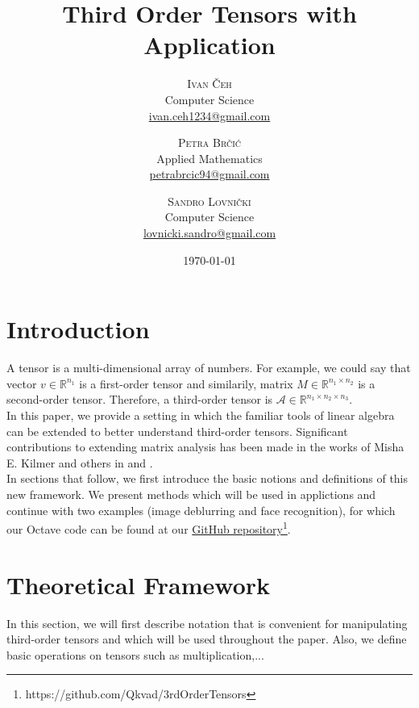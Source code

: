 \documentclass[twoside]{article}
\title{Third Order Tensors with Application} %
\author{%
\textsc{Ivan \v{C}eh}\\%
\normalsize Computer Science \\
\normalsize \href{mailto:ivan.ceh1234@gmail.com}{ivan.ceh1234@gmail.com} 
\and
\textsc{Petra Br\v{c}i\'c}\\%
\normalsize Applied Mathematics \\
\normalsize \href{mailto:petrabrcic94@gmail.com}{petrabrcic94@gmail.com} 
\and
\textsc{Sandro Lovni\v{c}ki}\\%
\normalsize Computer Science \\ 
\normalsize \href{mailto:lovnicki.sandro@gmail.com}{lovnicki.sandro@gmail.com}
}
\date{\today}
\begin{document}
\maketitle

\begin{multicols}{2}

\section{Introduction}
A tensor is a multi-dimensional array of numbers. For example, we could say that vector $v \in \mathbb{R}^{n_1}$ is a first-order tensor and similarily, matrix $M \in \mathbb{R}^{n_1 \times n_2}$ is a second-order tensor. Therefore, a third-order tensor is $\mathcal{A} \in \mathbb{R}^{n_1 \times n_2 \times n_3}$.\\
\indent In this paper, we provide a setting in which the familiar tools of linear algebra can be extended to better understand third-order tensors. Significant contributions to extending matrix analysis has been made in the works of Misha E. Kilmer and others in \cite{kilmer-braman-hao} and \cite{kilmer-martin}.\\
\indent In sections that follow, we first introduce the basic notions and definitions of this new framework. We present methods which will be used in applictions and continue with two examples (image deblurring and face recognition), for which our Octave code can be found at our \hyperref[https://github.com/Qkvad/3rdOrderTensors]{GitHub repository}\footnote{https://github.com/Qkvad/3rdOrderTensors}.

\section{Theoretical Framework}
In this section, we will first describe notation that is convenient for manipulating third-order tensors and which will be used throughout the paper. Also, we define basic operations on tensors such as multiplication,...


\end{multicols}
\end{document}

